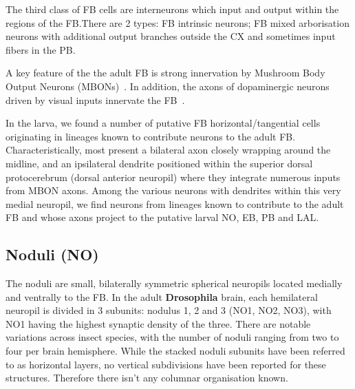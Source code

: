 \documentclass{article}
\begin{document}
The third class of FB cells are interneurons which input and output within the regions of the FB.There are 2 types: FB intrinsic neurons; FB mixed arborisation neurons with additional output branches outside the CX and sometimes input fibers in the PB.


A key feature of the the adult FB is strong innervation by Mushroom Body Output Neurons (MBONs)~\citep{MISSING}. %
In addition, the axons of dopaminergic neurons driven by visual inputs innervate the FB~\citep{lin2013comprehensive}.




In the larva, we found a number of putative FB horizontal/tangential cells
originating in lineages known to contribute neurons to the adult FB. Characteristically, most present a bilateral axon closely wrapping around the midline, and an ipsilateral dendrite positioned within the superior dorsal protocerebrum (dorsal anterior neuropil) where they integrate numerous inputs from MBON axons. Among the various neurons with dendrites within this very medial neuropil, we find neurons from lineages known to contribute to the adult FB and whose axons project to the putative larval NO, EB, PB and LAL.



\subsection{Noduli (NO)}


The noduli are small, bilaterally symmetric spherical neuropils located medially and ventrally to the FB. In the adult \textbf{Drosophila} brain, each hemilateral neuropil is divided in 3 subunits: nodulus 1, 2 and 3 (NO1, NO2, NO3), with NO1 having the highest synaptic density of the three. There are notable variations across insect species, with the number of noduli ranging from two to four per brain hemisphere.
While the stacked noduli subunits have been referred to as horizontal layers, no vertical subdivisions have been reported for these structures. Therefore there isn't any columnar organisation known.
\end{document}
